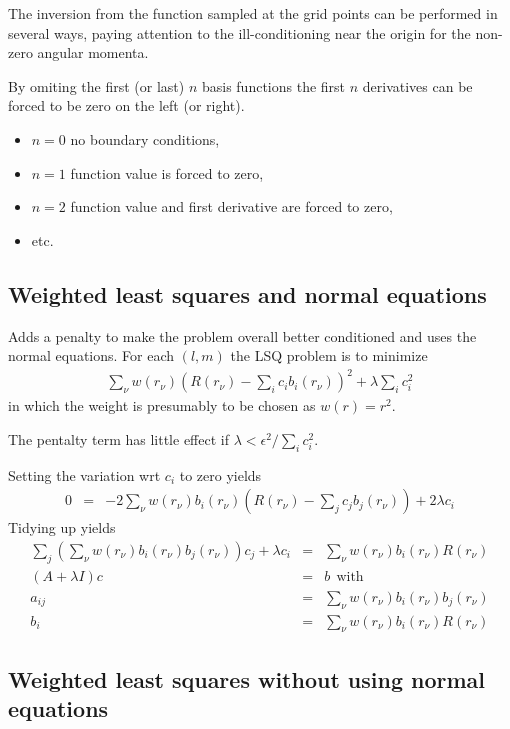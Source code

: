 \documentclass[12pt]{article}
\begin{document}
The inversion from the function sampled at the grid points can be performed in several ways, paying attention to the ill-conditioning near the origin for the non-zero angular momenta.

By omiting the first (or last) $n$ basis functions the first $n$ derivatives can be forced to be zero on the left (or right).  
\begin{itemize}
\item $n=0$ no boundary conditions,
\item $n=1$ function value is forced to zero,
\item $n=2$ function value and first derivative are forced to zero,
\item etc.
\end{itemize}

\subsection{Weighted least squares and normal equations}
Adds a penalty to make the problem overall better conditioned and uses the normal equations.  For each $(l,m)$ the LSQ problem is to minimize
\begin{eqnarray}
  \sum_\nu  w(r_\nu) \left( R(r_\nu) - \sum_i c_i b_i(r_\nu) \right)^2 + \lambda \sum_i c_i^2
\end{eqnarray}
in which the weight is presumably to be chosen as $w(r)=r^2$.

The pentalty term has little effect if $\lambda < \epsilon^2 / \sum_i c_i^2$. 

Setting the variation wrt $c_i$ to zero yields
\begin{eqnarray}
  0 & = & - 2 \sum_\nu  w(r_\nu) b_i(r_\nu) \left( R(r_\nu) - \sum_j c_j b_j(r_\nu) \right) + 2\lambda c_i
\end{eqnarray}
Tidying up yields
\begin{eqnarray}
  \sum_j \left( \sum_\nu w(r_\nu) b_i(r_\nu) b_j(r_\nu) \right) c_j + \lambda c_i & = & \sum_\nu  w(r_\nu) b_i(r_\nu)  R(r_\nu) \\
  \left( A + \lambda I \right) c & = & b ~ ~\mbox{with} \\
  a_{ij} & = & \sum_\nu w(r_\nu) b_i(r_\nu) b_j(r_\nu) \\
  b_i & = & \sum_\nu  w(r_\nu)  b_i(r_\nu) R(r_\nu) 
\end{eqnarray}

\subsection{Weighted least squares without using normal equations}
\end{document}

